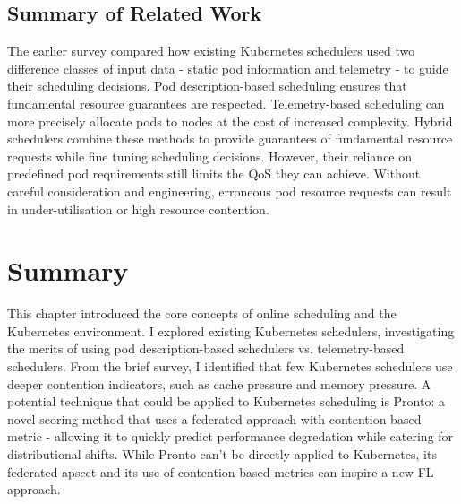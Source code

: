 \subsection{Summary of Related Work}
The earlier survey compared how existing Kubernetes schedulers used two
difference classes of input data - static pod information and telemetry - to
guide their scheduling decisions. Pod description-based scheduling ensures that
fundamental resource guarantees are respected. Telemetry-based scheduling can
more precisely allocate pods to nodes at the cost of increased complexity.
Hybrid schedulers combine these methods to provide guarantees of fundamental
resource requests while fine tuning scheduling decisions. However, their
reliance on predefined pod requirements still limits the QoS they can achieve.
Without careful consideration and engineering, erroneous pod resource requests
can result in under-utilisation or high resource contention.

\section{Summary}

This chapter introduced the core concepts of online scheduling and the
Kubernetes environment. I explored existing Kubernetes schedulers, investigating
the merits of using pod description-based schedulers vs. telemetry-based
schedulers. From the brief survey, I identified that few Kubernetes schedulers
use deeper contention indicators, such as cache pressure and memory pressure.
A potential technique that could be applied to Kubernetes scheduling is Pronto:
a novel scoring method that uses a federated approach with contention-based
metric - allowing it to quickly predict performance degredation while catering
for distributional shifts. While Pronto can't be directly applied to Kubernetes,
its federated apsect and its use of contention-based metrics can inspire a new
FL approach.


